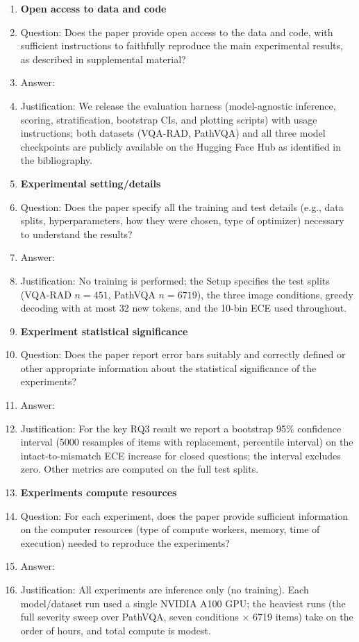 \begin{enumerate}
\item {\bf Open access to data and code}
    \item[] Question: Does the paper provide open access to the data and code, with sufficient instructions to faithfully reproduce the main experimental results, as described in supplemental material?
    \item[] Answer: \answerYes{}
    \item[] Justification: We release the evaluation harness (model-agnostic inference, scoring, stratification, bootstrap CIs, and plotting scripts) with usage instructions; both datasets (VQA-RAD, PathVQA) and all three model checkpoints are publicly available on the Hugging Face Hub as identified in the bibliography.

\item {\bf Experimental setting/details}
    \item[] Question: Does the paper specify all the training and test details (e.g., data splits, hyperparameters, how they were chosen, type of optimizer) necessary to understand the results?
    \item[] Answer: \answerYes{}
    \item[] Justification: No training is performed; the Setup specifies the test splits (VQA-RAD $n{=}451$, PathVQA $n{=}6719$), the three image conditions, greedy decoding with at most 32 new tokens, and the 10-bin ECE used throughout.

\item {\bf Experiment statistical significance}
    \item[] Question: Does the paper report error bars suitably and correctly defined or other appropriate information about the statistical significance of the experiments?
    \item[] Answer: \answerYes{}
    \item[] Justification: For the key RQ3 result we report a bootstrap 95\% confidence interval (5000 resamples of items with replacement, percentile interval) on the intact-to-mismatch ECE increase for closed questions; the interval excludes zero. Other metrics are computed on the full test splits.

\item {\bf Experiments compute resources}
    \item[] Question: For each experiment, does the paper provide sufficient information on the computer resources (type of compute workers, memory, time of execution) needed to reproduce the experiments?
    \item[] Answer: \answerYes{}
    \item[] Justification: All experiments are inference only (no training). Each model/dataset run used a single NVIDIA A100 GPU; the heaviest runs (the full severity sweep over PathVQA, seven conditions $\times$ 6719 items) take on the order of hours, and total compute is modest.


\end{enumerate}
